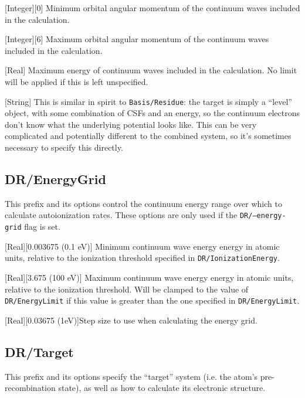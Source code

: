 \documentclass{report}
\begin{document}
[Integer][0]{%
Minimum orbital angular momentum of the continuum waves included in the calculation.%
}

[Integer][6]{%
Maximum orbital angular momentum of the continuum waves included in the calculation.%
}

[Real]{%
Maximum energy of continuum waves included in the calculation. No limit will be applied if this is left
unspecified.%
}


[String]{%
This is similar in spirit to \texttt{Basis/Residue}: the target
is simply a ``level'' object, with some combination of CSFs and an energy, so the continuum electrons
don't know what the underlying potential looks like. This can be very complicated and potentially
different to the combined system, so it's sometimes necessary to specify this directly.%
}

\subsection{DR/EnergyGrid}
This prefix and its options control the continuum energy range over which to calculate autoionization
rates. These options are only used if the \texttt{DR/--energy-grid} flag is set.

[Real][0.003675 (0.1 eV)]{%
Minimum continuum wave energy energy in atomic units, relative to the ionization threshold specified in
\texttt{DR/IonizationEnergy}.%
}

[Real][3.675 (100 eV)]{%
Maximum continuum wave energy energy in atomic units, relative to the ionization threshold. Will be
clamped to the value of \texttt{DR/EnergyLimit} if this value is greater than the one specified in
\texttt{DR/EnergyLimit}.%
}

[Real][0.03675 (1eV)]{Step size to use when calculating the energy grid.}

\subsection{DR/Target}
This prefix and its options specify the ``target'' system (i.e. the atom's pre-recombination state), as
well as how to calculate its electronic structure.
\end{document}
